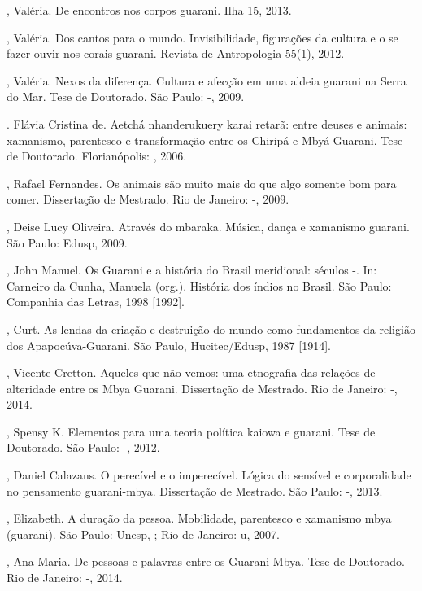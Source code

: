 \begin{Parskip}
, Valéria. De encontros nos corpos guarani. Ilha 15, 2013.

, Valéria. Dos cantos para o mundo. Invisibilidade, figurações da
cultura e o se fazer ouvir nos corais guarani. Revista de Antropologia
55(1), 2012.

, Valéria. Nexos da diferença. Cultura e afecção em uma aldeia
guarani na Serra do Mar. Tese de Doutorado. São Paulo: -, 2009.

. Flávia Cristina de. Aetchá nhanderukuery karai retarã: entre
deuses e animais: xamanismo, parentesco e transformação entre os
Chiripá e Mbyá Guarani. Tese de Doutorado. Florianópolis: , 2006.

 , Rafael Fernandes. Os animais são muito mais do que algo
somente bom para comer. Dissertação de Mestrado. Rio de Janeiro:
-, 2009.

, Deise Lucy Oliveira. Através do mbaraka. Música, dança e
xamanismo guarani. São Paulo: Edusp, 2009.

, John Manuel. Os Guarani e a história do Brasil meridional:
séculos -. In: Carneiro da Cunha, Manuela (org.). História dos
índios no Brasil. São Paulo: Companhia das Letras, 1998 [1992].

, Curt. As lendas da criação e destruição do mundo como
fundamentos da religião dos Apapocúva-Guarani. São Paulo,
Hucitec/Edusp, 1987 [1914].

, Vicente Cretton. Aqueles que não vemos: uma etnografia das
relações de alteridade entre os Mbya Guarani. Dissertação de Mestrado.
Rio de Janeiro: -, 2014.

, Spensy K. Elementos para uma teoria política kaiowa e guarani.
Tese de Doutorado. São Paulo: -, 2012.

, Daniel Calazans. O perecível e o imperecível. Lógica do sensível
e corporalidade no pensamento guarani-mbya. Dissertação de Mestrado.
São Paulo: -, 2013.

, Elizabeth. A duração da pessoa. Mobilidade, parentesco e
xamanismo mbya (guarani). São Paulo: Unesp, ; Rio de Janeiro: u,
2007.

  , Ana Maria. De pessoas e palavras entre os Guarani-Mbya.
Tese de Doutorado. Rio de Janeiro: -, 2014.


\end{Parskip}

